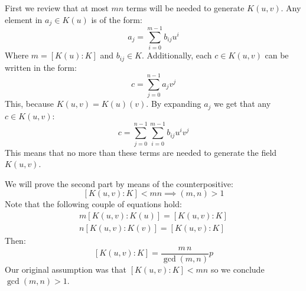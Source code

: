 First we review that at most $mn$ terms will be needed to generate $K(u,v)$.
Any element in $a_j\in K(u)$ is of the form:
$$a_j = \sum_{i=0}^{m-1} b_{ij} u^i$$
Where $m=[K(u):K]$ and $b_{ij}\in K$. 
Additionally, each $c\in K(u,v)$ can be written in the form:
$$c= \sum_{j=0}^{n-1} a_{j} v^j$$
This, because $K(u,v)= K(u)(v)$. By expanding $a_j$ we get that any $c\in K(u,v)$:
$$c= \sum_{j=0}^{n-1} \sum_{i=0}^{m-1} b_{ij} u^i v^j$$
This means that no more than these terms are needed to generate the field $K(u,v)$.

We will prove the second part by means of the counterpositive: 
$$[K(u,v):K]<mn \implies (m,n)>1$$ 
Note that the following couple of equations hold:
\begin{gather*}
m[K(u,v):K(u)] = [K(u,v):K]\\
n[K(u,v):K(v)] = [K(u,v):K]
\end{gather*}
Then:
$$[K(u,v):K] = \frac{m\, n}{\gcd(m,n)}p$$
Our original assumption was that $[K(u,v):K]<mn$ so we conclude $\gcd(m,n)>1$. 


